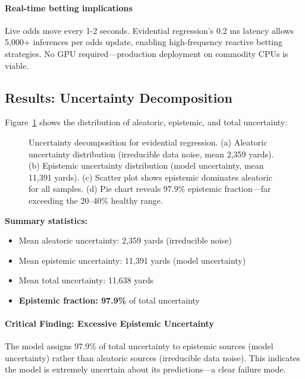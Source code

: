 \paragraph{Real-time betting implications} Live odds move every 1-2 seconds. Evidential regression's 0.2 ms latency allows 5,000+ inferences per odds update, enabling high-frequency reactive betting strategies. No GPU required—production deployment on commodity CPUs is viable.

\subsection{Results: Uncertainty Decomposition}

Figure~\ref{fig:evidential_uncertainty} shows the distribution of aleatoric, epistemic, and total uncertainty:

\begin{figure}[htbp]
    \centering
    
    \caption{Uncertainty decomposition for evidential regression. (a) Aleatoric uncertainty distribution (irreducible data noise, mean 2,359 yards). (b) Epistemic uncertainty distribution (model uncertainty, mean 11,391 yards). (c) Scatter plot shows epistemic dominates aleatoric for all samples. (d) Pie chart reveals 97.9\% epistemic fraction---far exceeding the 20--40\% healthy range.}
    \label{fig:evidential_uncertainty}
\end{figure}

\noindent \textbf{Summary statistics:}
\begin{itemize}[nosep]
    \item Mean aleatoric uncertainty: 2,359 yards (irreducible noise)
    \item Mean epistemic uncertainty: 11,391 yards (model uncertainty)
    \item Mean total uncertainty: 11,638 yards
    \item \textbf{Epistemic fraction: 97.9\%} of total uncertainty
\end{itemize}

\paragraph{Critical Finding: Excessive Epistemic Uncertainty} The model assigns 97.9\% of total uncertainty to epistemic sources (model uncertainty) rather than aleatoric sources (irreducible data noise). This indicates the model is extremely uncertain about its predictions—a clear failure mode.

